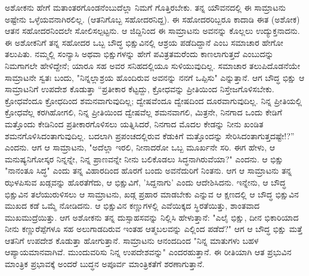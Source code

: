 ಅಶೋಕನು ಹೇಗೆ ಮತಾಂತರಗೊಂಡನೆಂಬುದೆಲ್ಲಾ ನಿಮಗೆ ಗೊತ್ತಿರಬೇಕು. ತನ್ನ ಯೌವನದಲ್ಲಿ ಈ ಸಾಮ್ರಾಟನು ಅಷ್ಟೇನು ಒಳ್ಳೆಯವನಾಗಿರಲಿಲ್ಲ. (ಆತನಿಗೊಬ್ಬ ಸಹೋದರನಿದ್ದ). ಈ ಸಹೋದರರಿಬ್ಬರೂ ಕಾದಾಡಿ ಈತ (ಅಶೋಕ) ಆತನ ಸಹೋದರನಿಂದಲೇ ಸೋಲಿಸಲ್ಪಟ್ಟನು. ಆ ಜಿದ್ದಿನಿಂದ ಈ ಸಾಮ್ರಾಟನು ಅವನನ್ನು ಕೊಲ್ಲಲು ಉದ್ಯುಕ್ತನಾದನು. ಈ ಅಶೋಕನಿಗೆ ತನ್ನ ಸಹೋದರ ಒಬ್ಬ ಬೌದ್ಧ ಭಿಕ್ಷುವಿನಲ್ಲಿ ಆಶ್ರಯ ಪಡೆದಿದ್ದಾನೆ ಎಂಬ ಸಮಾಚಾರ ಹೇಗೋ ತಲುಪಿತು. ನಮ್ಮಲ್ಲಿ ಸಂನ್ಯಾಸಿ ಅಥವಾ ಭಿಕ್ಷುಗಳನ್ನು ಹೇಗೆ ಪವಿತ್ರತಮರೆಂದು ಕಾಣಲಾಗುತ್ತದೆ ಎಂಬುದನ್ನು ನಿಮಗಾಗಲೇ ಹೇಳಿದ್ದೇನೆ; ಯಾರೂ ಸಹ ಅವರ ಸನಿಹದಲ್ಲಿಯೂ ಸುಳಿಯುವುದಿಲ್ಲ. ಸಮಾಚಾರ ತಲುಪಿದೊಡನೆಯೇ ಸಾಮ್ರಾಟನೇ ಸ್ವತಃ ಬಂದು, "ನಿನ್ನಲ್ಲಾಶ್ರಯ ಹೊಂದಿರುವ ಅವನನ್ನು ನನಗೆ ಒಪ್ಪಿಸು" ಎನ್ನುತ್ತಾನೆ. ಆಗ ಬೌದ್ಧ ಭಿಕ್ಷು ಆ ಸಾಮ್ರಾಟನಿಗೆ ಉಪದೇಶ ಕೊಡುತ್ತಾ “ಪ್ರತೀಕಾರ ಕೆಟ್ಟದ್ದು, ಕ್ರೋಧವನ್ನು ಪ್ರೀತಿಯಿಂದ ನಿಸ್ತೇಜಗೊಳಿಸಬೇಕು. ಕ್ರೋಧವೆಂದೂ ಕ್ರೋಧದಿಂದ ಶಮನವಾಗುವುದಿಲ್ಲ; ದ್ವೇಷವೆಂದೂ ದ್ವೇಷದಿಂದ ದೂರವಾಗುವುದಿಲ್ಲ. ನಿನ್ನ ಪ್ರೀತಿಯಲ್ಲಿ ಕ್ರೋಧವೆಲ್ಲ ಕರಗಿಹೋಗಲಿ, ನಿನ್ನ ಪ್ರೀತಿಯಿಂದ ದ್ವೇಷವೆಲ್ಲ ಶಮನವಾಗಲಿ, ಮಿತ್ರನೇ, ನಿನಗಾದ ಒಂದು ಕೇಡಿಗೆ ಮತ್ತೊಂದು ಕೇಡಿನಿಂದ ಪ್ರತೀಕಾರಗೊಳಿಸಲು ಯತ್ನಿಸಿದರೆ, ನಿನಗಾದ ಮೊದಲ ಕೇಡನ್ನು ನೀನು ಖಂಡಿತ ಶಮನಗೊಳಿಸಿದಂತಾಗುವುದಿಲ್ಲ. ಬದಲಾಗಿ ಪ್ರಪಂಚದಲ್ಲಿರುವ ಕೆಡುಕಿಗೆ ಮತ್ತೊಂದನ್ನು ಸೇರಿಸಿದಂತಾಗುತ್ತದಷ್ಟೇ!?” ಎಂದನು. ಆಗ ಆ ಸಾಮ್ರಾಟನು, "ಅದೆಲ್ಲಾ ಇರಲಿ, ನೀನಾದರೋ ಒಬ್ಬ ಮೂರ್ಖನೇ ಸರಿ. ಈಗ ಹೇಳು, ಆ ಮನುಷ್ಯನಿಗೋಸ್ಕರ ನಿನ್ನನ್ನೇ, ನಿನ್ನ ಪ್ರಾಣವನ್ನೇ ನೀನು ಬಲಿಕೊಡಲು ಸಿದ್ಧನಾಗಿರುವೆಯಾ?" ಎಂದನು. ಆ ಭಿಕ್ಷು "ನಾನಂತೂ ಸಿದ್ಧ" ಎಂದು ತನ್ನ ವಿಹಾರದಿಂದ ಹೊರಗೆ ಬಂದು ಅವನೆದುರಿಗೆ ನಿಂತನು. ಆಗ ಆ ಸಾಮ್ರಾಟನು ತನ್ನ ಝಳಪಿಸುವ ಖಡ್ಗವನ್ನು ಹೊರತೆಗೆದು, ಆ ಭಿಕ್ಷುವಿಗೆ, 'ಸಿದ್ದನಾಗು' ಎಂದು ಆದೇಶಿಸಿದನು. ಇನ್ನೇನು, ಆ ಬೌದ್ಧ ಭಿಕ್ಷುವಿನ ತಲೆಯುರುಳಿಸಲು ಆ ಸಾಮ್ರಾಟನು, ಖಡ್ಗ ಪ್ರಹಾರ ಮಾಡಬೇಕು ಎನ್ನುವ ಆ ಕ್ಷಣದಲ್ಲಿ ಆ ಬೌದ್ಧ ಭಿಕ್ಷುವಿನ ಮುಖದ ಕಡೆ ಒಮ್ಮೆ ನೋಡಿದನು. ಆ ಭಿಕ್ಷುವಿನ ಕಣ್ಣುಗಳಲ್ಲಿ ಎವೆಯಿಕ್ಕದ ಸ್ಥಿರತೆಯಿತ್ತು, ಶಾಂತವಾದ ಮುಖಮುದ್ರೆಯಿತ್ತು. ಆಗ ಅಶೋಕನು ತನ್ನ ದುಸ್ಸಾಹಸವನ್ನು ನಿಲ್ಲಿಸಿ ಹೇಳುತ್ತಾನೆ: "ಎಲೈ ಭಿಕ್ಷು, ದೀನ ಭಿಕಾರಿಯಾದ ನೀನು ಕಣ್ಣುರೆಪ್ಪೆಗಳೂ ಸಹ ಅಲುಗಾಡದಿರುವ ಇಂತಹ ಆತ್ಮಬಲವನ್ನು ಎಲ್ಲಿಂದ ಪಡೆದೆ?" ಆಗ ಆ ಬೌದ್ಧ ಭಿಕ್ಷು ಮತ್ತೆ ಆತನಿಗೆ ಉಪದೇಶ ಕೊಡುತ್ತಾ ಹೋಗುತ್ತಾನೆ. ಸಾಮ್ರಾಟನು ಆನಂದದಿಂದ "ನಿನ್ನ ಮಾತುಗಳು ಬಹಳ ಆಪ್ಯಾಯಮಾನವಾಗಿವೆ. ಮುಂದುವರಿಸು ನಿನ್ನ ಉಪದೇಶವನ್ನು" ಎಂದರಹುತ್ತಾನೆ. ಈ ರೀತಿಯಾಗಿ ಆತ ಪ್ರಭುವಿನ ಮಾಂತ್ರಿಕ ಪ್ರಭಾವಕ್ಕೆ ಅಂದರೆ ಬುದ್ಧನ ಅಪೂರ್ವ ಮಾಂತ್ರಿಕತೆಗೆ ಶರಣಾಗುತ್ತಾನೆ.

